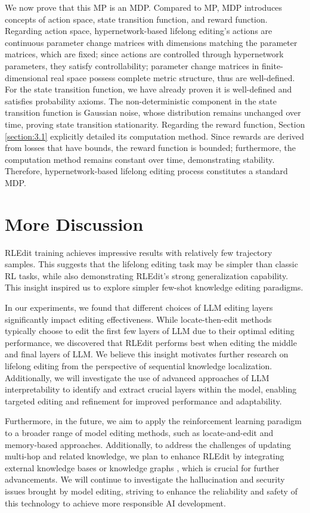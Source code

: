 We now prove that this MP is an MDP. Compared to MP, MDP introduces concepts of action space, state transition function, and reward function. Regarding action space, hypernetwork-based lifelong editing's actions are continuous parameter change matrices with dimensions matching the parameter matrices, which are fixed; since actions are controlled through hypernetwork parameters, they satisfy controllability; parameter change matrices in finite-dimensional real space possess complete metric structure, thus are well-defined. For the state transition function, we have already proven it is well-defined and satisfies probability axioms. The non-deterministic component in the state transition function is Gaussian noise, whose distribution remains unchanged over time, proving state transition stationarity. Regarding the reward function, Section \ref{section:3.1} explicitly detailed its computation method. Since rewards are derived from losses that have bounds, the reward function is bounded; furthermore, the computation method remains constant over time, demonstrating stability. Therefore, hypernetwork-based lifelong editing process constitutes a standard MDP.


\section{More Discussion}
\label{app:discussion}
RLEdit training achieves impressive results with relatively few trajectory samples. This suggests that the lifelong editing task may be simpler than classic RL tasks, while also demonstrating RLEdit's strong generalization capability. This insight inspired us to explore simpler few-shot knowledge editing paradigms.

In our experiments, we found that different choices of LLM editing layers significantly impact editing effectiveness. While locate-then-edit methods \cite{memit} typically choose to edit the first few layers of LLM due to their optimal editing performance, we discovered that RLEdit performs best when editing the middle and final layers of LLM. We believe this insight motivates further research on lifelong editing from the perspective of sequential knowledge localization. Additionally, we will investigate the use of advanced approaches of LLM interpretability \cite{he2024cracking,zhou2024role} to identify and extract crucial layers within the model, enabling targeted editing and refinement for improved performance and adaptability. 

Furthermore, in the future, we aim to apply the reinforcement learning paradigm to a broader range of model editing methods, such as locate-and-edit \cite{anyedit} and memory-based \cite{wise} approaches. Additionally, to address the challenges of updating multi-hop and related knowledge, we plan to enhance RLEdit by integrating external knowledge bases or knowledge graphs \cite{entity,surveygraphrag,differentiable}, which is crucial for further advancements. We will continue to investigate the hallucination and security issues \cite{injectharm, correct} brought by model editing, striving to enhance the reliability and safety of this technology to achieve more responsible AI development.

